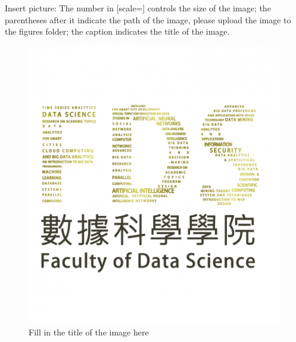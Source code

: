 \documentclass[12pt,hyperref,a4paper,UTF8]{ctexart}
\begin{document}
Insert picture:
The number in [scale=] controls the size of the image; the parentheses after it indicate the path of the image, please upload the image to the figures folder; the caption indicates the title of the image.
\begin{figure}[h]
    \centering
    \includegraphics[scale=0.1]{figures/FDS logo.jpg}
    \caption{Fill in the title of the image here}
\end{figure}
\end{document}

